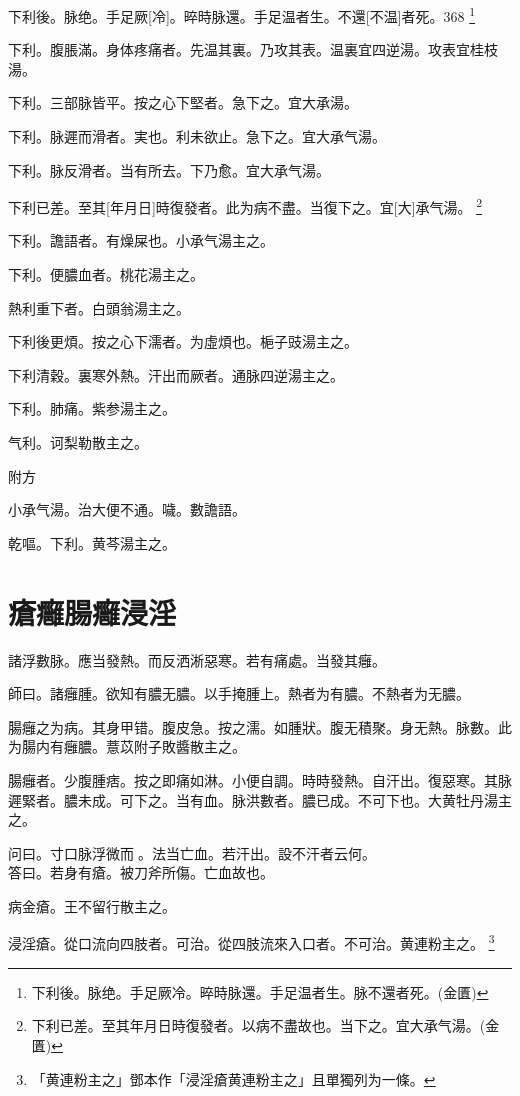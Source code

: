 \documentclass[11pt,oneside,b5paper]{ctexbook}
\begin{document}
\begin{flushleft}
下利後。脉绝。手足厥[冷]。晬時脉還。手足温者生。不還[不温]者死。368
\footnote{下利後。脉绝。手足厥冷。晬時脉還。手足温者生。脉不還者死。(金匱)}

下利。腹脹滿。身体疼痛者。先温其裏。乃攻其表。温裏宜四逆湯。攻表宜桂枝湯。

下利。三部脉皆平。按之心下堅者。急下之。宜大承湯。

下利。脉遲而滑者。実也。利未欲止。急下之。宜大承气湯。

下利。脉反滑者。当有所去。下乃愈。宜大承气湯。

下利已差。至其[年月日]時復發者。此为病不盡。当復下之。宜[大]承气湯。
\footnote{下利已差。至其年月日時復發者。以病不盡故也。当下之。宜大承气湯。(金匱)}

下利。譫語者。有燥屎也。小承气湯主之。

下利。便膿血者。桃花湯主之。

熱利重下者。白頭翁湯主之。

下利後更煩。按之心下濡者。为虛煩也。梔子豉湯主之。

下利清穀。裏寒外熱。汗出而厥者。通脉四逆湯主之。

下利。肺痛。紫参湯主之。

气利。诃梨勒散主之。

附方

小承气湯。治大便不通。噦。數譫語。

乾嘔。下利。黄芩湯主之。

\chapter{瘡癰腸癰浸淫}

諸浮數脉。應当發熱。而反洒淅惡寒。若有痛處。当發其癰。

師曰。諸癰腫。欲知有膿无膿。以手掩腫上。熱者为有膿。不熱者为无膿。

腸癰之为病。其身甲错。腹皮急。按之濡。如腫狀。腹无積聚。身无熱。脉數。此为腸内有癰膿。薏苡附子敗醬散主之。

腸癰者。少腹腫痞。按之即痛如淋。小便自調。時時發熱。自汗出。復惡寒。其脉遲緊者。膿未成。可下之。当有血。脉洪數者。膿已成。不可下也。大黄牡丹湯主之。

问曰。寸口脉浮微而{𬈧}。法当亡血。若汗出。設不汗者云何。\\
答曰。若身有瘡。被刀斧所傷。亡血故也。

病金瘡。王不留行散主之。

浸淫瘡。從口流向四肢者。可治。從四肢流來入口者。不可治。黄連粉主之。
\footnote{「黄連粉主之」鄧本作「浸淫瘡黄連粉主之」且單獨列为一條。}


\end{flushleft}
\end{document}
